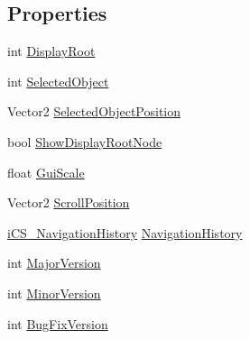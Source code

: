 \subsection*{Properties}
\begin{DoxyCompactItemize}
\item 
int \hyperlink{interfacei_c_s___i_visual_script_data_adf7a14db20d51d85ab9b9b8a295d9e15}{Display\+Root}
\item 
int \hyperlink{interfacei_c_s___i_visual_script_data_a71a91420adc27a5259d9ea9b09dc7dce}{Selected\+Object}
\item 
Vector2 \hyperlink{interfacei_c_s___i_visual_script_data_a5621e5e8b6fc341c84ed69e2e9fd6303}{Selected\+Object\+Position}
\item 
bool \hyperlink{interfacei_c_s___i_visual_script_data_a84963c0b8e72b7d669e53022162ad830}{Show\+Display\+Root\+Node}
\item 
float \hyperlink{interfacei_c_s___i_visual_script_data_a66639bc05fd5e29a68d81f7c702401e4}{Gui\+Scale}
\item 
Vector2 \hyperlink{interfacei_c_s___i_visual_script_data_a751ce2f6cb3c9284b251b65a9d65b391}{Scroll\+Position}
\item 
\hyperlink{classi_c_s___navigation_history}{i\+C\+S\+\_\+\+Navigation\+History} \hyperlink{interfacei_c_s___i_visual_script_data_adec7fcea3a793ca7c74803246aaebb08}{Navigation\+History}
\item 
int \hyperlink{interfacei_c_s___i_visual_script_data_a7e80330b2e190b3fba47684d6539d337}{Major\+Version}
\item 
int \hyperlink{interfacei_c_s___i_visual_script_data_a6138d8cabb590ad734529cbfb193ab48}{Minor\+Version}
\item 
int \hyperlink{interfacei_c_s___i_visual_script_data_a9c7450656ec18fc630a4958740ea4d4f}{Bug\+Fix\+Version}

\end{DoxyCompactItemize}
